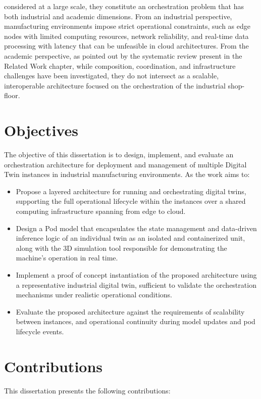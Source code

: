 considered at a large scale, they constitute an orchestration problem that has both industrial and academic dimensions. From an 
industrial perspective, manufacturing environments impose strict operational constraints, such as edge nodes with limited computing 
resources, network reliability, and real-time data processing with latency that can be unfeasible in cloud architectures. From the 
academic perspective, as pointed out by the systematic review present in the Related Work chapter, while composition, coordination, 
and infrastructure challenges have been investigated, they do not intersect as a scalable, interoperable architecture focused on 
the orchestration of the industrial shop-floor.

\section{Objectives}
\label{ch:objectives}

The objective of this dissertation is to design, implement, and evaluate an orchestration
architecture for deployment and management of multiple Digital Twin instances in industrial
manufacturing environments. As the work aims to:
\begin{itemize}
    \item Propose a layered architecture for running and orchestrating digital twins, supporting the full operational lifecycle within the \DT instances over a shared computing infrastructure spanning from edge to cloud.
    \item Design a \DT Pod model that encapsulates the state management and data-driven inference logic of an individual twin as an isolated and containerized unit, along with the 3D simulation tool responsible for demonstrating the machine's operation in real time.
    \item Implement a proof of concept instantiation of the proposed architecture using a representative industrial digital twin, sufficient to validate the orchestration mechanisms under realistic operational conditions.
    \item Evaluate the proposed architecture against the requirements of scalability between instances, and operational continuity during model updates and pod lifecycle events.
\end{itemize}

\section{Contributions}
\label{ch:contributions}
This dissertation presents the following contributions:

